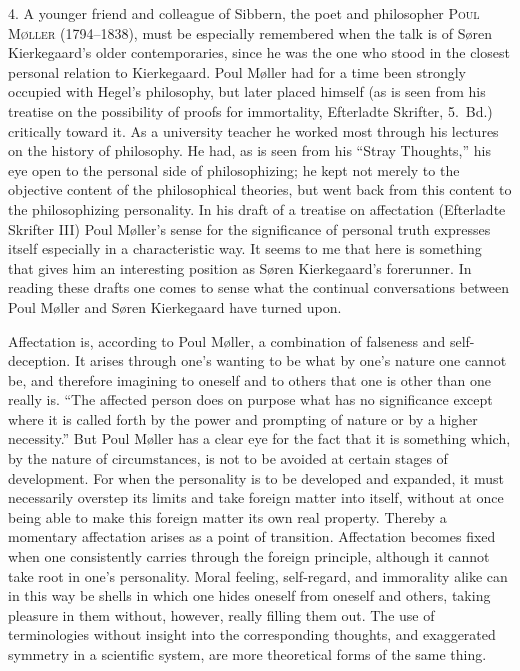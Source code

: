 \documentclass[12pt,a4paper]{book}
\newcommand{\opage}[1]{\marginnote{\footnotesize\textit{[#1]}}}
\begin{document}
4. A younger friend and colleague of Sibbern, the poet
and philosopher \textsc{Poul Møller} (1794--1838), must be especially
remembered when the talk is of Søren Kierkegaard's older contemporaries,
since he was the one who stood in the closest personal relation to
Kierkegaard. Poul Møller had for a time been strongly occupied with Hegel's
philosophy, but later placed himself (as is seen from his treatise on the
possibility of proofs for immortality, Efterladte Skrifter,
5.~Bd.) critically toward it. As a university teacher he worked most
through his lectures on the history of philosophy. He had, as is seen
from his ``Stray Thoughts,'' his eye open to the personal side of
philosophizing; he kept not merely to the objective content of the
philosophical theories, but went back from this content to the
philosophizing personality. In his draft of a treatise on affectation
(Efterladte Skrifter III) Poul Møller's sense for the
significance of personal truth expresses itself especially in a
characteristic way. It seems to me that here is something that gives him
an interesting position as Søren Kierkegaard's forerunner. In reading
these drafts one comes to sense what the continual conversations between
Poul Møller and Søren Kierkegaard have turned upon.

Affectation is, according to Poul Møller, a combination of falseness and
self-deception. It arises through one's wanting to be what by one's nature
one cannot be, and therefore imagining to oneself and to others that one is
other than one really is. ``The affected person does
\opage{25}on purpose what has no significance except where it is called forth by
the power and prompting of nature or by a higher necessity.'' But Poul
Møller has a clear eye for the fact that it is something which, by the
nature of circumstances, is not to be avoided at certain stages of
development. For when the personality is to be developed and expanded, it
must necessarily overstep its limits and take foreign matter into itself,
without at once being able to make this foreign matter its own real
property. Thereby a momentary affectation arises as a point of
transition. Affectation becomes fixed when one consistently carries
through the foreign principle, although it cannot take root in one's
personality. Moral feeling, self-regard, and immorality alike can in this
way be shells in which one hides oneself from oneself and others, taking
pleasure in them without, however, really filling them out. The use of
terminologies without insight into the corresponding thoughts, and
exaggerated symmetry in a scientific system, are more theoretical forms of
the same thing.
\end{document}

